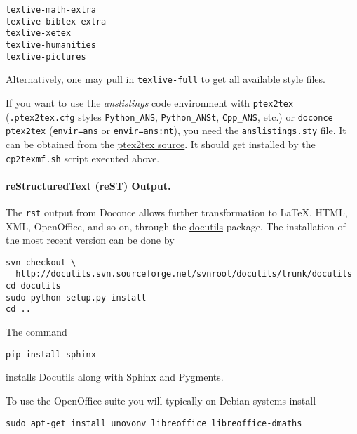 \documentclass[%
oneside,                 %
final,                   %
10pt]{article}
\begin{document}
\begin{Verbatim}[fontsize=\fontsize{9pt}{9pt},tabsize=8,baselinestretch=0.85,fontfamily=tt,xleftmargin=7mm]
texlive-math-extra
texlive-bibtex-extra
texlive-xetex
texlive-humanities
texlive-pictures
\end{Verbatim}
\noindent
Alternatively, one may pull in {\fontsize{10pt}{10pt}\Verb!texlive-full!} to get all available
style files.

If you want to use the \emph{anslistings} code environment with {\fontsize{10pt}{10pt}\Verb!ptex2tex!}
({\fontsize{10pt}{10pt}\Verb!.ptex2tex.cfg!} styles {\fontsize{10pt}{10pt}\Verb!Python_ANS!}, {\fontsize{10pt}{10pt}\Verb!Python_ANSt!}, {\fontsize{10pt}{10pt}\Verb!Cpp_ANS!}, etc.) or
{\fontsize{10pt}{10pt}\Verb!doconce ptex2tex!} ({\fontsize{10pt}{10pt}\Verb!envir=ans!} or {\fontsize{10pt}{10pt}\Verb!envir=ans:nt!}), you need the
{\fontsize{10pt}{10pt}\Verb!anslistings.sty!} file. It can be obtained from
the \href{{https://code.google.com/p/ptex2tex/source/browse/trunk/latex/styles/with_license/anslistings.sty}}{ptex2tex source}. It should get installed
by the {\fontsize{10pt}{10pt}\Verb!cp2texmf.sh!} script executed above.


\paragraph{reStructuredText (reST) Output.}
The {\fontsize{10pt}{10pt}\Verb!rst!} output from Doconce allows further transformation to {\LaTeX},
HTML, XML, OpenOffice, and so on, through the \href{{http://docutils.sourceforge.net}}{docutils} package.  The installation of the
most recent version can be done by

\vspace{4pt}
\begin{Verbatim}[numbers=none,frame=lines,fontsize=\fontsize{9pt}{9pt},labelposition=topline,framesep=2.5mm,framerule=0.7pt]
svn checkout \ 
  http://docutils.svn.sourceforge.net/svnroot/docutils/trunk/docutils
cd docutils
sudo python setup.py install
cd ..
\end{Verbatim}
The command

\vspace{4pt}
\begin{Verbatim}[numbers=none,frame=lines,fontsize=\fontsize{9pt}{9pt},labelposition=topline,framesep=2.5mm,framerule=0.7pt]
pip install sphinx
\end{Verbatim}
installs Docutils along with Sphinx and Pygments.

To use the OpenOffice suite you will typically on Debian systems install
\vspace{4pt}
\begin{Verbatim}[numbers=none,frame=lines,fontsize=\fontsize{9pt}{9pt},labelposition=topline,framesep=2.5mm,framerule=0.7pt]
sudo apt-get install unovonv libreoffice libreoffice-dmaths
\end{Verbatim}
\end{document}

